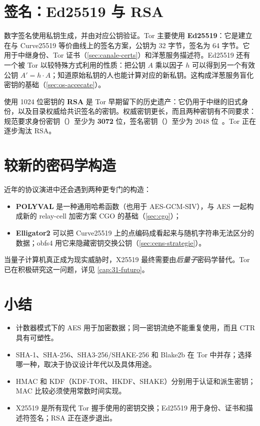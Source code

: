 \section{签名：Ed25519 与 RSA}\label{sec:cripto-firme}

数字签名使用私钥生成，并由对应公钥验证。Tor 主要使用 \textbf{Ed25519}：它是建立在与 Curve25519 等价曲线上的签名方案，公钥为 32 字节，签名为 64 字节。它用于中继身份、Tor 证书（\cref{sec:canale-certs}）和洋葱服务描述符。Ed25519 还有一个被 Tor 以较特殊方式利用的性质：把公钥 $A$ 乘以因子 $h$ 可以得到另一个有效公钥 $A' = h \cdot A$；知道原始私钥的人也能计算对应的新私钥。这构成洋葱服务盲化密钥的基础（\cref{sec:os-accecate}）。

使用 1024 位密钥的 \textbf{RSA} 是 Tor 早期留下的历史遗产：它仍用于中继的旧式身份，以及目录权威给共识签名的密钥。权威密钥更长，而且两种密钥有不同要求：规范要求身份密钥（）至少为 \textbf{3072} 位，签名密钥（）至少为 2048 位~。Tor 正在逐步淘汰 RSA。

\section{较新的密码学构造}\label{sec:cripto-recente}

近年的协议演进中还会遇到两种更专门的构造：
\begin{itemize}
  \item \textbf{POLYVAL} 是一种通用哈希函数（也用于 AES-GCM-SIV），与 AES 一起构成新的 relay-cell 加密方案 CGO 的基础（\cref{sec:cgo}）；
  \item \textbf{Elligator2} 可以把 Curve25519 上的点编码成看起来与随机字符串无法区分的数据；obfs4 用它来隐藏密钥交换公钥（\cref{sec:cens-strategie}）。
\end{itemize}
当量子计算机真正成为现实威胁时，X25519 最终需要由\emph{后量子}密码学替代。Tor 已在积极研究这一问题，详见 \cref{cap:31-futuro}。

\section*{小结}
\begin{itemize}
  \item 计数器模式下的 AES 用于加密数据；同一密钥流绝不能重复使用，而且 CTR 具有可塑性。
  \item SHA-1、SHA-256、SHA3-256/SHAKE-256 和 Blake2b 在 Tor 中并存；选择哪一种，取决于协议设计年代以及具体用途。
  \item HMAC 和 KDF（KDF-TOR、HKDF、SHAKE）分别用于认证和派生密钥；MAC 比较必须使用常数时间实现。
  \item X25519 是所有现代 Tor 握手使用的密钥交换；Ed25519 用于身份、证书和描述符签名；RSA 正在逐步退出。
\end{itemize}

